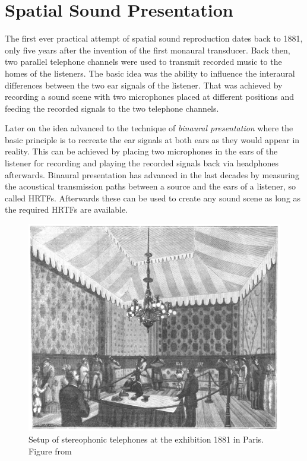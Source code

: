 \section{Spatial Sound Presentation}

The first ever practical attempt of spatial sound reproduction dates back to
1881, only five years after the invention of the first monaural transducer.
Back then, two parallel telephone channels were used to transmit recorded
music to the homes of the listeners.\cite{DuMoncel1881a}
The basic idea was the ability to influence the interaural
differences between the two ear signals of the listener. That was achieved by
recording a sound scene with two microphones placed at different positions 
and feeding the recorded signals to the two telephone channels.

Later on the idea advanced to the technique of \emph{binaural presentation} where the basic
principle is to recreate the ear signals at both ears as they would appear in reality.
This can
be achieved by placing two microphones in the ears of the listener for recording and playing the
recorded signals back via headphones afterwards.
Binaural presentation has advanced in the last decades by measuring the
acoustical transmission paths between a source and the ears of a listener, so called
\acp{HRTF}. Afterwards these can be used to create any sound scene as long as
the required \acp{HRTF} are available.
%
\begin{figure}[t]
    \centering
    \includegraphics[width=.8\columnwidth]{fig1_01/stereo_telephone}
    \caption{Setup of stereophonic telephones at the exhibition 1881 in
    Paris. Figure from \cite{DuMoncel1881a}
    }
    \label{fig:stereo_telephone}
\end{figure}

